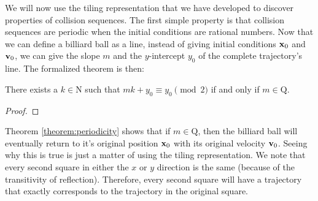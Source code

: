 We will now use the tiling representation that we have developed to discover properties of collision sequences. The first simple property is that collision sequences are periodic when the initial conditions are rational numbers. Now that we can define a billiard ball as a line, instead of giving initial conditions $\mathbf{x}_0$ and $\mathbf{v}_0$, we can give the slope $m$ and the $y$-intercept $y_0$ of the complete trajectory's line. The formalized theorem is then:

\begin{theorem}
  \label{theorem:periodicity}
  There exists a $k \in \mathrm{N}$ such that $mk + y_0 \equiv y_0 \pmod{2}$ if and only if $m \in \mathrm{Q}$.
\end{theorem}
\begin{proof}
\end{proof}

Theorem \ref{theorem:periodicity} shows that if $m \in \mathrm{Q}$, then the billiard ball will eventually return to it's original position $\mathbf{x}_0$ with its original velocity $\mathbf{v}_0$. Seeing why this is true is just a matter of using the tiling representation. We note that every second square in either the $x$ or $y$ direction is the same (because of the transitivity of reflection). Therefore, every second square will have a trajectory that exactly corresponds to the trajectory in the original square.
